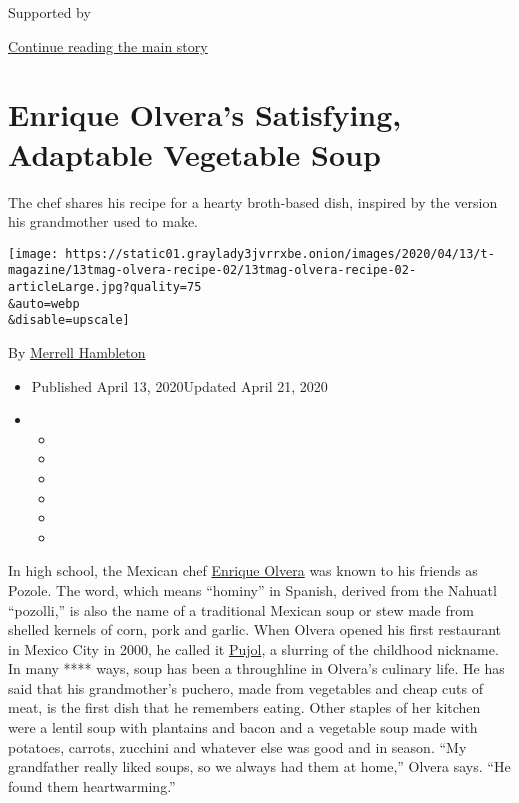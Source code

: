 Supported by

\protect\hyperlink{after-sponsor}{Continue reading the main story}

\hypertarget{enrique-olveras-satisfying-adaptable-vegetable-soup}{%
\section{Enrique Olvera's Satisfying, Adaptable Vegetable
Soup}\label{enrique-olveras-satisfying-adaptable-vegetable-soup}}

The chef shares his recipe for a hearty broth-based dish, inspired by
the version his grandmother used to make.

\texttt{[image: https://static01.graylady3jvrrxbe.onion/images/2020/04/13/t-magazine/13tmag-olvera-recipe-02/13tmag-olvera-recipe-02-articleLarge.jpg?quality=75\\\&auto=webp\\\&disable=upscale]}

By
\href{https://www.nytimes3xbfgragh.onion/by/merrell-hambleton}{Merrell
Hambleton}

\begin{itemize}
\item
  Published April 13, 2020Updated April 21, 2020
\item
  \begin{itemize}
  \item
  \item
  \item
  \item
  \item
  \item
  \end{itemize}
\end{itemize}

In high school, the Mexican chef
\href{https://www.instagram.com/enriqueolveraf/?hl=en}{Enrique Olvera}
was known to his friends as Pozole. The word, which means ``hominy'' in
Spanish, derived from the Nahuatl ``pozolli,'' is also the name of a
traditional Mexican soup or stew made from shelled kernels of corn, pork
and garlic. When Olvera opened his first restaurant in Mexico City in
2000, he called it \href{https://pujol.com.mx/en/}{Pujol}, a slurring of
the childhood nickname. In many **** ways, soup has been a throughline
in Olvera's culinary life. He has said that his grandmother's puchero,
made from vegetables and cheap cuts of meat, is the first dish that he
remembers eating. Other staples of her kitchen were a lentil soup with
plantains and bacon and a vegetable soup made with potatoes, carrots,
zucchini and whatever else was good and in season. ``My grandfather
really liked soups, so we always had them at home,'' Olvera says. ``He
found them heartwarming.''

